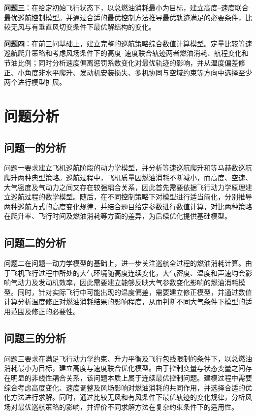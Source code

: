 \documentclass[UTF8]{ctexart}
\begin{document}
\textbf{问题三}：在给定初始飞行状态下，以总燃油消耗最小为目标，建立高度--速度联合最优巡航控制模型。并通过合适的最优控制方法推导最优轨迹满足的必要条件，比较无风与有垂直风切变条件下最优解结构的变化。

\textbf{问题四}：在前三问基础上，建立完整的巡航策略综合数值计算模型。定量比较等速巡航爬升策略和考虑风场条件下的高度--速度联合轨迹两者燃油消耗、航程变化和节油比例；同时分析速度偏离惩罚系数变化对最优轨迹的影响，并从温度偏差修正、小角度非水平爬升、发动机安装损失、多机协同与空域约束等方向中选择至少两个进行模型扩展。

\section{问题分析}

\subsection{问题一的分析}
问题一要求建立飞机巡航阶段的动力学模型，并分析等速巡航爬升和等马赫数巡航爬升两种典型策略。巡航过程中，飞机质量因燃油消耗不断减小，而高度、空速、大气密度及气动力之间又存在较强耦合关系，因此首先需要依据飞行动力学原理建立巡航过程的数学模型。随后，在不同控制策略下对模型进行适当简化，分别推导两种巡航方式的高度变化规律，并结合题目给定参数进行数值计算，对比两种策略在爬升率、飞行时间及燃油消耗等方面的差异，为后续优化提供基础模型。

\subsection{问题二的分析}
问题二在问题一动力学模型的基础上，进一步关注巡航全过程的燃油消耗计算。由于飞机飞行过程中所处的大气环境随高度连续变化，大气密度、温度和声速均会影响气动力及发动机效率，因此需要建立能够反映大气参数变化影响的燃油消耗模型。同时，针对实际飞行中可能出现的温度偏差，需要建立修正模型，并通过数值计算分析温度修正对燃油消耗结果的影响程度，从而判断不同大气条件下模型的适用范围及修正的必要性。

\subsection{问题三的分析}
问题三要求在满足飞行动力学约束、升力平衡及飞行包线限制的条件下，以总燃油消耗最小为目标，建立高度与速度联合优化模型。由于控制变量与状态变量之间存在明显的非线性耦合关系，该问题本质上属于连续最优控制问题。建模过程中需要综合考虑高度变化、速度调整及风场影响对燃油消耗的共同作用，并选择合适的优化方法进行求解。同时，通过比较无风和有风条件下最优轨迹的变化规律，分析风场对最优巡航策略的影响，并评价不同求解方法在复杂约束条件下的适用性。
\end{document}
